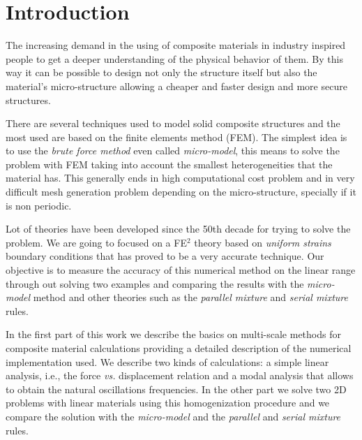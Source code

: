 \documentclass[review]{elsarticle}
\begin{document}
\linenumbers

\section{Introduction}

The increasing demand in the using of composite materials in industry inspired people
to get a deeper understanding of the physical behavior of them. By this way it
can be possible to design not only the structure itself but also the material's
micro-structure allowing a cheaper and faster design and more secure structures.

There are several techniques used to model solid composite structures and the
most used are based on the finite elements method (FEM).
The simplest idea is to use the \emph{brute force method}
even called \emph{micro-model}, this means to solve the problem with FEM
taking into account the smallest heterogeneities that the material has.
This generally ends in high computational cost problem and in very difficult mesh
generation problem depending on the micro-structure, specially if it is non
periodic.

Lot of theories have been developed since the 50th decade for trying to solve
the problem. We are going to focused on a FE$^2$ theory based on
\emph{uniform strains} boundary conditions that has proved to be a very accurate technique.
Our objective is to measure the accuracy of this numerical method on the linear 
range through out solving two examples and comparing the results with the 
\emph{micro-model} method and other theories such as the \emph{parallel mixture} 
and \emph{serial mixture} rules. 

In the first part of this work we describe the basics on multi-scale methods
for composite material calculations providing a detailed description of the
numerical implementation used. We describe two kinds of calculations: a simple
linear analysis, i.e., the force \emph{vs.} displacement relation
and a modal analysis that allows to obtain the natural oscillations
frequencies.
In the other part we solve two 2D problems with linear materials using this 
homogenization procedure and we compare the solution with the \emph{micro-model} 
and the \emph{parallel} and \emph{serial mixture} rules. 

\end{document}
